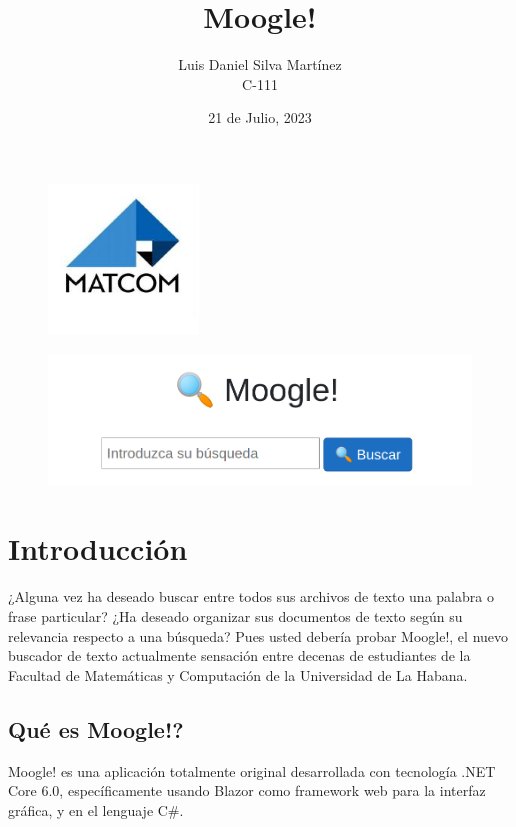 \documentclass[12pt,a4paper]{article}
\begin{document}
\title{\Huge \bf Moogle!}
\author{\LARGE Luis Daniel Silva Martínez \\ C-111}
\date{21 de Julio, 2023}
\maketitle

\vspace{1cm}
\begin{figure}[h]
    \center
    \includegraphics[width=4cm]{matcom.jpg}
\end{figure}


\begin{figure}[h]
    \center
    \includegraphics[width=15cm]{moogle.png}
\end{figure}



\newpage
\tableofcontents
\newpage


\section{Introducción}\label{sec:intro}
¿Alguna vez ha deseado buscar entre todos sus archivos de texto una palabra o frase particular? ¿Ha deseado organizar sus documentos de texto según su relevancia respecto a una búsqueda? 
Pues usted debería probar Moogle!, el nuevo buscador de texto actualmente sensación entre decenas de estudiantes de la Facultad de Matemáticas y Computación de la Universidad de La Habana.
\subsection{Qué es Moogle!?}\label{sub:what}
Moogle! es una aplicación totalmente original desarrollada con tecnología .NET Core 6.0, específicamente usando Blazor como framework web para la interfaz gráfica, y en el lenguaje C\#.
\end{document}
